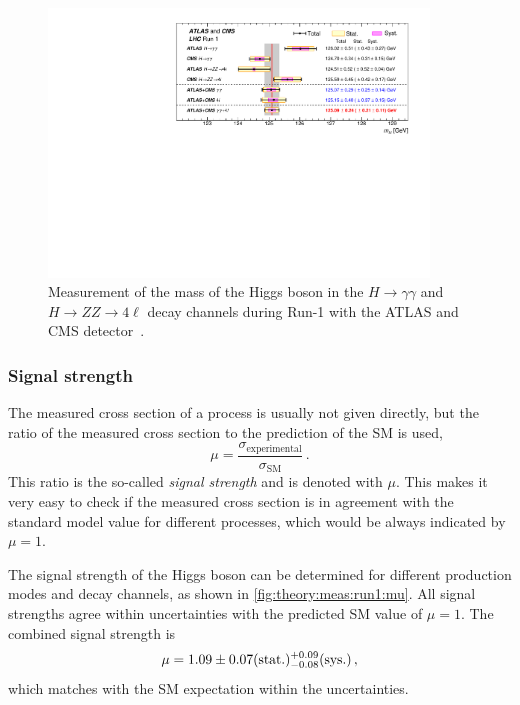 \begin{figure}[htb]
    \centering
    \includegraphics[width=0.9\textwidth]{./figures/theory/mass_combination_atlascms.pdf}
    \caption{Measurement of the mass of the Higgs boson in the $H\to\gamma\gamma$ and $H \to ZZ \to 4\ell$ decay channels during Run-1 with the ATLAS and CMS detector~\cite{MassCombinedMeas}.}\label{fig:theory:meas:run1:mass}
\end{figure}

\subsubsection{Signal strength}\label{subsub:theory:meas:run1:mu}

The measured cross section of a process is usually not given directly, but the ratio of the measured cross section
to the prediction of the SM is used,
\begin{equation}
    \mu = \frac{\sigma_\text{experimental}}{\sigma_\text{SM}} \,.
\end{equation}
This ratio is the so-called \emph{signal strength} and is denoted with $\mu$.
This makes it very easy to check if the measured cross section is in agreement with the standard model value for different processes, which would be
always indicated by $\mu = 1$.

The signal strength of the Higgs boson can be determined for different production modes and decay channels, as shown in \cref{fig:theory:meas:run1:mu}.
All signal strengths agree within uncertainties with the predicted SM value of $\mu = 1$.
The combined signal strength is~\cite{HiggsMuCombined}
\begin{equation}
    \mu = 1.09 \pm  0.07 \text{(stat.)} {}^{+{0.09}}_{-{0.08}} \text{(sys.)} \,,
\end{equation}
which matches with the SM expectation within the uncertainties.

